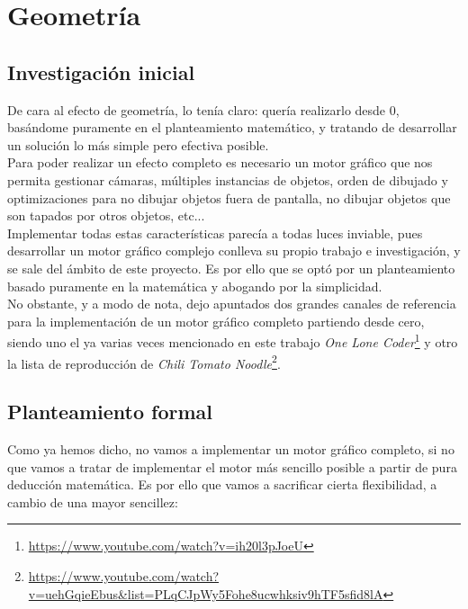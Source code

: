 \section{Geometría} \label{sec:geometry}

\subsection{Investigación inicial}

De cara al efecto de geometría, lo tenía claro: quería realizarlo desde 0, basándome puramente en el planteamiento matemático, y tratando de desarrollar un solución lo más simple pero efectiva posible.\\

Para poder realizar un efecto completo es necesario un motor gráfico que nos permita gestionar cámaras, múltiples instancias de objetos, orden de dibujado y optimizaciones para no dibujar objetos fuera de pantalla, no dibujar objetos que son tapados por otros objetos, etc...\\

Implementar todas estas características parecía a todas luces inviable, pues desarrollar un motor gráfico complejo conlleva su propio trabajo e investigación, y se sale del ámbito de este proyecto. Es por ello que se optó por un planteamiento basado puramente en la matemática y abogando por la simplicidad.\\

No obstante, y a modo de nota, dejo apuntados dos grandes canales de referencia para la implementación de un motor gráfico completo partiendo desde cero, siendo uno el ya varias veces mencionado en este trabajo \emph{One Lone Coder}\footnote{\url{https://www.youtube.com/watch?v=ih20l3pJoeU}} y otro la lista de reproducción de \emph{Chili Tomato Noodle}\footnote{\url{https://www.youtube.com/watch?v=uehGqieEbus&list=PLqCJpWy5Fohe8ucwhksiv9hTF5sfid8lA}}.

\subsection{Planteamiento formal}

Como ya hemos dicho, no vamos a implementar un motor gráfico completo, si no que vamos a tratar de implementar el motor más sencillo posible a partir de pura deducción matemática. Es por ello que vamos a sacrificar cierta flexibilidad, a cambio de una mayor sencillez:

